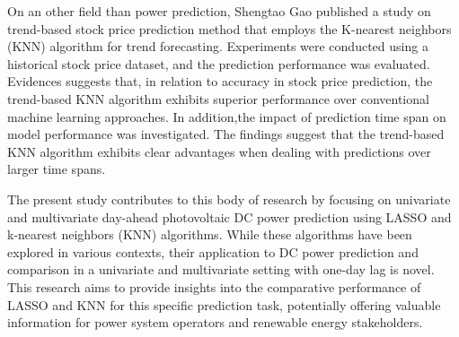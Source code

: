 On an other field than power prediction, Shengtao Gao \cite{atlantis125995001} published a study on trend-based stock price prediction method that employs the K-nearest neighbors (KNN) algorithm for trend forecasting. Experiments were conducted using a historical stock price dataset, and the prediction performance was evaluated. Evidences suggests that, in relation to accuracy in stock price prediction, the trend-based KNN algorithm exhibits superior performance over conventional machine learning approaches. In addition,the impact of prediction time span on model performance was investigated. The findings suggest that the trend-based KNN algorithm exhibits clear advantages when dealing with predictions over larger time spans.

The present study contributes to this body of research by focusing on univariate and multivariate day-ahead photovoltaic DC power prediction using LASSO and k-nearest neighbors (KNN) algorithms. While these algorithms have been explored in various contexts, their application to DC power prediction and comparison in a univariate and multivariate setting with one-day lag is novel. This research aims to provide insights into the comparative performance of LASSO and KNN for this specific prediction task, potentially offering valuable information for power system operators and renewable energy stakeholders.